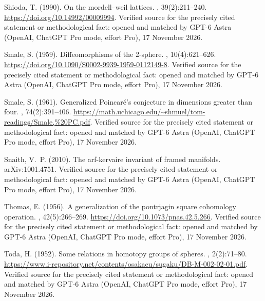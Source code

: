 \begin{thebibliography}{}
Shioda, T. (1990).
\newblock On the mordell--weil lattices.
,
  39(2):211--240.
\newblock \url{https://doi.org/10.14992/00009994}. Verified source for the precisely cited statement or methodological fact: opened and matched by GPT-6 Astra (OpenAI, ChatGPT Pro mode, effort Pro), 17 November 2026.

Smale, S. (1959).
\newblock Diffeomorphisms of the 2-sphere.
,
  10(4):621--626.
\newblock \url{https://doi.org/10.1090/S0002-9939-1959-0112149-8}. Verified source for the precisely cited statement or methodological fact: opened and matched by GPT-6 Astra (OpenAI, ChatGPT Pro mode, effort Pro), 17 November 2026.

Smale, S. (1961).
\newblock Generalized {Poincar\'e}'s conjecture in dimensions greater than
  four.
, 74(2):391--406.
\newblock \url{https://math.uchicago.edu/~shmuel/tom-readings/Smale,%20PC.pdf}. Verified source for the precisely cited statement or methodological fact: opened and matched by GPT-6 Astra (OpenAI, ChatGPT Pro mode, effort Pro), 17 November 2026.

Snaith, V.~P. (2010).
\newblock The arf-kervaire invariant of framed manifolds.
\newblock arXiv:1001.4751. Verified source for the precisely cited statement or methodological fact: opened and matched by GPT-6 Astra (OpenAI, ChatGPT Pro mode, effort Pro), 17 November 2026.

Thomas, E. (1956).
\newblock A generalization of the pontrjagin square cohomology operation.
, 42(5):266--269.
\newblock \url{https://doi.org/10.1073/pnas.42.5.266}. Verified source for the precisely cited statement or methodological fact: opened and matched by GPT-6 Astra (OpenAI, ChatGPT Pro mode, effort Pro), 17 November 2026.

Toda, H. (1952).
\newblock Some relations in homotopy groups of spheres.
, 2(2):71--80.
\newblock \url{https://www.i-repository.net/contents/osakacu/sugaku/DB-M-002-02-01.pdf}. Verified source for the precisely cited statement or methodological fact: opened and matched by GPT-6 Astra (OpenAI, ChatGPT Pro mode, effort Pro), 17 November 2026.


\end{thebibliography}
